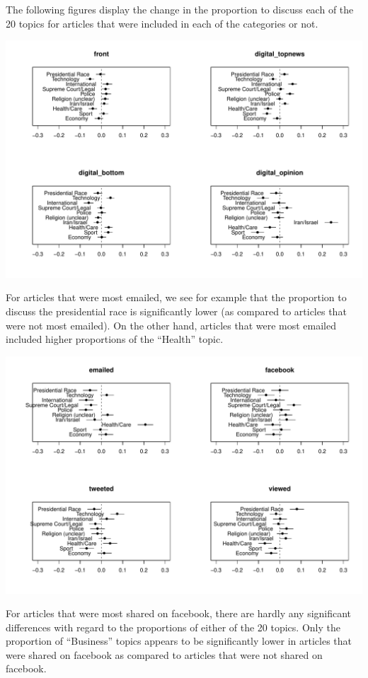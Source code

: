 \documentclass[12pt]{article}\usepackage[]{graphicx}\usepackage[]{color}
\makeatletter
\def\maxwidth{ %
  \ifdim\Gin@nat@width>\linewidth
    \linewidth
  \else
    \Gin@nat@width
  \fi
}
\newenvironment{knitrout}{}{} %
\makeatother
\begin{document}
The following figures display the change in the proportion to discuss each of the 20 topics for articles that were included in each of the categories or not.



\begin{knitrout}
\color{fgcolor}
\includegraphics[width=\maxwidth]{figure/unnamed-chunk-7-1} 

\end{knitrout}
For articles that were most emailed, we see for example that the proportion to discuss the presidential race is significantly lower (as compared to articles that were not most emailed). On the other hand, articles that were most emailed included higher proportions of the ``Health'' topic.

\clearpage
\begin{knitrout}
\color{fgcolor}
\includegraphics[width=\maxwidth]{figure/unnamed-chunk-8-1} 

\end{knitrout}
For articles that were most shared on facebook, there are hardly any significant differences with regard to the proportions of either of the 20 topics. Only the proportion of ``Business'' topics appears to be significantly lower in articles that were shared on facebook as compared to articles that were not shared on facebook.
\end{document}
